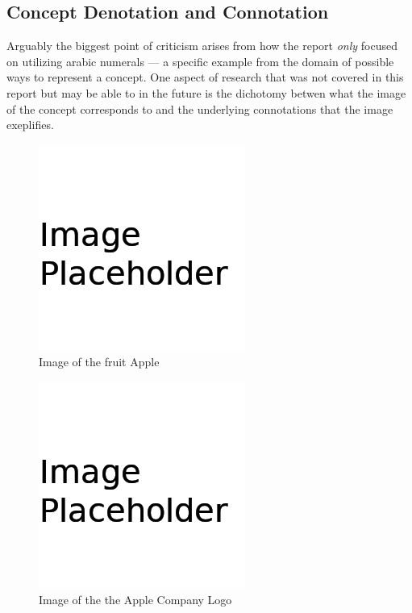 \documentclass[conference]{IEEEtran}
\begin{document}

\subsection{Concept Denotation and Connotation}%


Arguably the biggest point of criticism arises from how the report \textit{only}
focused on utilizing arabic numerals --- a specific example from the domain of
possible ways to represent a concept. One aspect of research that was not
covered in this report but may be able to in the future is the dichotomy betwen
what the image of the concept corresponds to and the underlying connotations
that the image exeplifies.


\begin{figure}[H]
  \centering
  \includegraphics[width=0.8\linewidth]{figures/placeholder.png}
  \caption{Image of the fruit Apple}%
  \label{fig:AppleFruit}
\end{figure}


\begin{figure}[H]
  \centering
  \includegraphics[width=0.8\linewidth]{figures/placeholder.png}
  \caption{Image of the the Apple Company Logo}%
  \label{fig:AppleCompanyLogo}
\end{figure}
\end{document}
